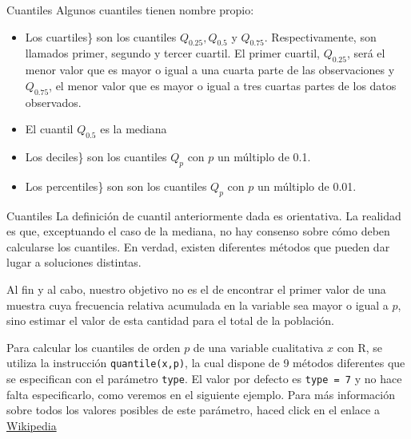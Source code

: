\documentclass[
  ignorenonframetext,
]{beamer}
\providecommand{\tightlist}{%
  \setlength{\itemsep}{0pt}\setlength{\parskip}{0pt}}
\begin{document}
\begin{frame}{Cuantiles}
\label{cuantiles}
Algunos cuantiles tienen nombre propio:

\begin{itemize}
\tightlist
\item
  Los cuartiles\} son los cuantiles \(Q_{0.25},Q_{0.5}\) y \(Q_{0.75}\).
  Respectivamente, son llamados primer, segundo y tercer cuartil. El
  primer cuartil, \(Q_{0.25}\), será el menor valor que es mayor o igual
  a una cuarta parte de las observaciones y \(Q_{0.75}\), el menor valor
  que es mayor o igual a tres cuartas partes de los datos observados.
\item
  El cuantil \(Q_{0.5}\) es la mediana
\item
  Los deciles\} son los cuantiles \(Q_p\) con \(p\) un múltiplo de 0.1.
\item
  Los percentiles\} son son los cuantiles \(Q_p\) con \(p\) un múltiplo
  de 0.01.
\end{itemize}
\end{frame}

\begin{frame}[fragile]{Cuantiles}
\label{cuantiles-1}
La definición de cuantil anteriormente dada es orientativa. La realidad
es que, exceptuando el caso de la mediana, no hay consenso sobre cómo
deben calcularse los cuantiles. En verdad, existen diferentes métodos
que pueden dar lugar a soluciones distintas.

Al fin y al cabo, nuestro objetivo no es el de encontrar el primer valor
de una muestra cuya frecuencia relativa acumulada en la variable sea
mayor o igual a \(p\), sino estimar el valor de esta cantidad para el
total de la población.

Para calcular los cuantiles de orden \(p\) de una variable cualitativa
\(x\) con R, se utiliza la instrucción \texttt{quantile(x,p)}, la cual
dispone de 9 métodos diferentes que se especifican con el parámetro
\texttt{type}. El valor por defecto es \texttt{type\ =\ 7} y no hace
falta especificarlo, como veremos en el siguiente ejemplo. Para más
información sobre todos los valores posibles de este parámetro, haced
click en el enlace a
\href{https://es.wikipedia.org/wiki/Cuantil}{Wikipedia}
\end{frame}
\end{document}
